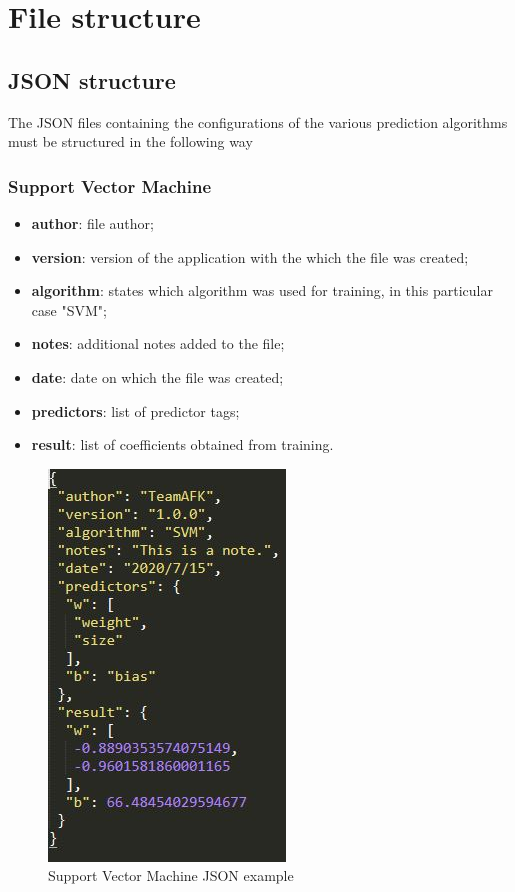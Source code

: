 \section{File structure}
\subsection{JSON structure}
The JSON files containing the configurations of the various prediction algorithms must be structured in the following way

\subsubsection{Support Vector Machine}
\begin{itemize}
	\item \textbf{author}: file author;
	\item \textbf{version}: version of the application with the which the file was created;
	\item \textbf{algorithm}: states which algorithm was used for training, in this particular case "SVM";
	\item \textbf{notes}: additional notes added to the file;
	\item \textbf{date}: date on which the file was created;
	\item \textbf{predictors}: list of predictor tags;
	\item \textbf{result}: list of coefficients obtained from training.
\end{itemize}
\begin{figure}[H]
\centering
\includegraphics[scale=0.65]{img/json/jsonSVM.JPG}
\caption{Support Vector Machine JSON example}
\end{figure}
\newpage

